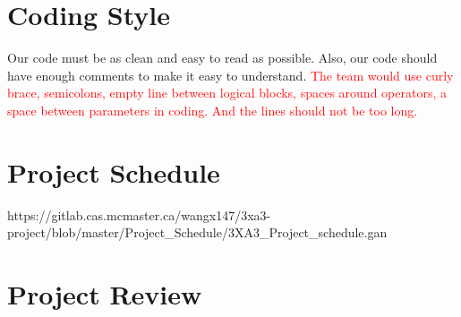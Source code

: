 \documentclass[12pt, titlepage]{article}
\begin{document}
\section{Coding Style}
Our code must be as clean and easy to read as possible. Also, our code should have enough comments to make it easy to understand. \textcolor{red}{The team would use curly brace, semicolons, empty line between logical blocks, spaces around operators, a space between parameters in coding. And the lines should not be too long.}

\section{Project Schedule}

https://gitlab.cas.mcmaster.ca/wangx147/3xa3-project/blob/master/Project\_Schedule/3XA3\_Project\_schedule.gan

\section{Project Review}
\end{document}
